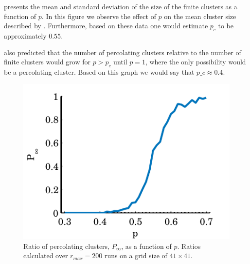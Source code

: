  presents the mean and standard deviation of the size of the finite clusters as a function of $p$. In this figure we observe the effect of $p$ on the mean cluster size described by \citeauthor{kenzel1997physics}. Furthermore, based on these data one would estimate $p_c$ to be approximately $0.55$. 

\citeauthor{kenzel1997physics} also predicted that the number of percolating clusters relative to the number of finite clusters would grow for $p > p_c$ until $p = 1$, where the only possibility would be a percolating cluster. Based on this graph we would say that $p\_c \approx 0.4$. 






\begin{figure}
	\centering
	\includegraphics[width=\columnwidth]{./img/assignment_a_p_infinite_ratio_p.pdf}
	\caption{Ratio of percolating clusters, $P_\infty$, as a function of $p$. Ratios calculated over $r_{max} = 200$ runs on a grid size of $41 \times 41$.}
	\label{fig:experiment:p_inf_ratio}
\end{figure}